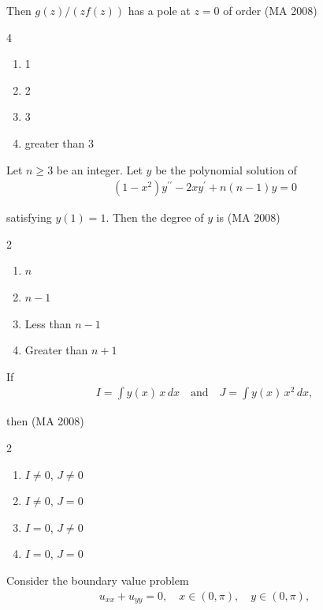 \item
Then $g(z)/ (z f(z))$ has a pole at $z=0$ of order
\hfill (MA 2008)
\begin{multicols}{4}
\begin{enumerate}
    \item 1
    \item 2
    \item 3
    \item greater than 3
\end{enumerate}
\end{multicols}

\item
Let $n \geq 3$ be an integer. Let $y$ be the polynomial solution of
\begin{align}
    (1 - x^2) y^{\prime \prime} - 2 x y^{\prime} + n(n-1) y = 0
\end{align}

satisfying $y(1) = 1$. Then the degree of $y$ is
\hfill (MA 2008)
\begin{multicols}{2}
\begin{enumerate}
    \item $n$
    \item $n-1$
    \item Less than $n-1$
    \item Greater than $n+1$
\end{enumerate}
\end{multicols}

\item
If
\begin{align}
    I = \int y(x) \, x \, dx \quad \text{and} \quad J = \int y(x) \, x^2 \, dx,
\end{align}

then
\hfill (MA 2008)
\begin{multicols}{2}
\begin{enumerate}
    \item $I \neq 0$, $J \neq 0$
    \item $I \neq 0$, $J = 0$
    \item $I = 0$, $J \neq 0$
    \item $I = 0$, $J = 0$
\end{enumerate}
\end{multicols}

\item
Consider the boundary value problem
\begin{align}
    u_{xx} + u_{yy} = 0, \quad x \in (0,\pi), \quad y \in (0,\pi),
\end{align}

